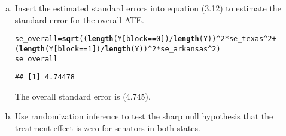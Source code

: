 \documentclass[11pt,notitlepage]{article}\usepackage[]{graphicx}\usepackage[]{color}
\makeatletter
\newcommand{\hlnum}[1]{\textcolor[rgb]{0.686,0.059,0.569}{#1}}%
\newcommand{\hlopt}[1]{\textcolor[rgb]{0,0,0}{#1}}%
\newcommand{\hlstd}[1]{\textcolor[rgb]{0.345,0.345,0.345}{#1}}%
\newcommand{\hlkwb}[1]{\textcolor[rgb]{0.69,0.353,0.396}{#1}}%
\newcommand{\hlkwd}[1]{\textcolor[rgb]{0.737,0.353,0.396}{\textbf{#1}}}%
\newenvironment{kframe}{%
 \def\at@end@of@kframe{}%
 \ifinner\ifhmode%
  \def\at@end@of@kframe{\end{minipage}}%
  \begin{minipage}{\columnwidth}%
 \fi\fi%
 \def\FrameCommand##1{\hskip\@totalleftmargin \hskip-\fboxsep
 \colorbox{shadecolor}{##1}\hskip-\fboxsep
     \hskip-\linewidth \hskip-\@totalleftmargin \hskip\columnwidth}%
 \MakeFramed {\advance\hsize-\width
   \@totalleftmargin\z@ \linewidth\hsize
   \@setminipage}}%
 {\par\unskip\endMakeFramed%
 \at@end@of@kframe}
\newenvironment{knitrout}{}{} %
\makeatother
\begin{document}
\begin{enumerate}[a)]
\item Insert the estimated standard errors into equation (3.12) to estimate the standard error for the overall ATE.

\begin{knitrout}
\color{fgcolor}\begin{kframe}
\begin{alltt}
\hlstd{se_overall}\hlkwb{=} \hlkwd{sqrt}\hlstd{((}\hlkwd{length}\hlstd{(Y[block}\hlopt{==}\hlnum{0}\hlstd{])}\hlopt{/}\hlkwd{length}\hlstd{(Y))}\hlopt{^}\hlnum{2} \hlopt{*}\hlstd{se_texas}\hlopt{^}\hlnum{2} \hlopt{+}
                 \hlstd{(}\hlkwd{length}\hlstd{(Y[block}\hlopt{==}\hlnum{1}\hlstd{])}\hlopt{/}\hlkwd{length}\hlstd{(Y))}\hlopt{^}\hlnum{2} \hlopt{*}\hlstd{se_arkansas}\hlopt{^}\hlnum{2}\hlstd{)}
\hlstd{se_overall}
\end{alltt}
\begin{verbatim}
## [1] 4.74478
\end{verbatim}
\end{kframe}
\end{knitrout}

The overall standard error is (4.745).

\item Use randomization inference to test the sharp null hypothesis that the treatment effect is zero for senators in both states.


\end{enumerate}
\end{document}
